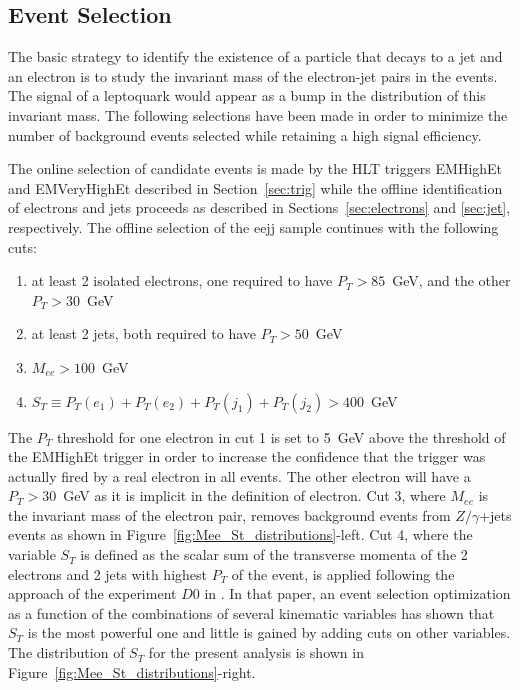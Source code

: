 \documentclass{cmspaper}
\begin{document}
\begin{linenumbers}

\section{Event Selection} \label{sec:eventSelection}
The basic strategy to identify the existence of a particle that decays to a jet and an electron 
is to study the invariant mass of the electron-jet pairs in the events. 
The signal of a leptoquark would appear as a bump in the distribution of this invariant mass.
The following selections have been made in order to minimize the number of background events 
selected while retaining a high signal efficiency.

The online selection of candidate events is made by the HLT triggers EMHighEt and EMVeryHighEt 
described in Section~\ref{sec:trig} while the offline identification of electrons and jets 
proceeds as described in Sections~\ref{sec:electrons} and \ref{sec:jet}, respectively.
The offline selection of the eejj sample continues with the following cuts:

\begin{enumerate}
\item at least 2 isolated electrons, one required to have $P_T>85$~GeV, 
and the other $P_T>30$~GeV 
\item at least 2 jets, both required to have $P_T>50$~GeV
\item $M_{ee}>100$~GeV
\item $S_T\equiv P_T(e_1)+P_T(e_2)+P_T(j_1)+P_T(j_2)>400$~GeV
\end{enumerate}

The $P_T$ threshold for one electron in cut 1 is set to 5~GeV above the threshold of the EMHighEt trigger 
in order to increase the confidence that the trigger was actually fired by a real electron in all events.
The other electron will have a $P_T>30$~GeV as it is implicit in the definition of electron. 
Cut 3, where $M_{ee}$ is the invariant mass of the electron pair, removes background events from 
$Z/\gamma$+jets events as shown in Figure~\ref{fig:Mee_St_distributions}-left.
Cut 4, where the variable $S_T$ is defined as the scalar sum of the transverse momenta of the 
2 electrons and 2 jets with highest $P_{T}$ of the event, 
is applied following the approach of the experiment $D0$ in 
\cite{Abazov:2001mx}. In that paper, an event selection optimization as a function of
the combinations of several kinematic variables has shown that $S_T$ is the most powerful one 
and little is gained by adding cuts on other variables. The distribution of $S_T$ for the present
analysis is shown in Figure~\ref{fig:Mee_St_distributions}-right.



\end{linenumbers}
\end{document}
